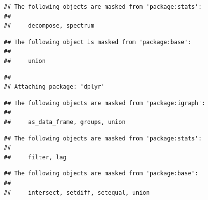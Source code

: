 \documentclass[
]{article}
\newenvironment{Shaded}{\begin{snugshade}}{\end{snugshade}}
\newcommand{\AttributeTok}[1]{\textcolor[rgb]{0.13,0.29,0.53}{#1}}
\newcommand{\FunctionTok}[1]{\textcolor[rgb]{0.13,0.29,0.53}{\textbf{#1}}}
\newcommand{\NormalTok}[1]{#1}
\newcommand{\OtherTok}[1]{\textcolor[rgb]{0.56,0.35,0.01}{#1}}
\newcommand{\SpecialCharTok}[1]{\textcolor[rgb]{0.81,0.36,0.00}{\textbf{#1}}}
\newcommand{\StringTok}[1]{\textcolor[rgb]{0.31,0.60,0.02}{#1}}
\begin{document}
\begin{verbatim}
## The following objects are masked from 'package:stats':
## 
##     decompose, spectrum
\end{verbatim}

\begin{verbatim}
## The following object is masked from 'package:base':
## 
##     union
\end{verbatim}

\begin{Shaded}
\end{Shaded}

\begin{verbatim}
## 
## Attaching package: 'dplyr'
\end{verbatim}

\begin{verbatim}
## The following objects are masked from 'package:igraph':
## 
##     as_data_frame, groups, union
\end{verbatim}

\begin{verbatim}
## The following objects are masked from 'package:stats':
## 
##     filter, lag
\end{verbatim}

\begin{verbatim}
## The following objects are masked from 'package:base':
## 
##     intersect, setdiff, setequal, union
\end{verbatim}
\end{document}
